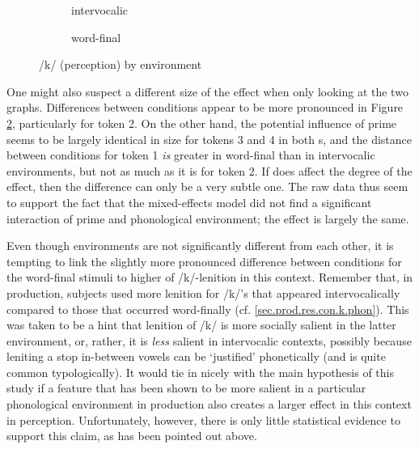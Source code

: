 \begin{figure}[h]
	\centering
	\begin{subfigure}{0.49\textwidth}
		\centering
			\resizebox{\linewidth}{!}{} 
		\caption{intervocalic}
		\label{fig.bar.k.ext.intervoc}
	\end{subfigure}
	\begin{subfigure}{0.49\textwidth}
		\centering
			\resizebox{\linewidth}{!}{}
		\caption{word-final}
		\label{fig.bar.k.ext.wordfinal}
	\end{subfigure}
	\caption{/k/ (perception) by environment}
	\label{fig.bar.k.ext.environment}
\end{figure}

One might also suspect a different size of the  effect when only looking at the two graphs.
Differences between conditions appear to be more pronounced in Figure \ref{fig.bar.k.ext.wordfinal}, particularly for token 2.
On the other hand, the potential influence of prime seems to be largely identical in size for tokens 3 and 4 in both s, and the distance between conditions for token 1 \emph{is} greater in word-final than in intervocalic environments, but not as much as it is for token 2.
If  does affect the degree of the  effect, then the difference can only be a very subtle one.
The raw data thus seem to support the fact that the mixed-effects model did not find a significant interaction of prime and phonological environment; the effect is largely the same.

Even though environments are not significantly different from each other, it is tempting to link the slightly more pronounced difference between  conditions for the word-final stimuli to higher  of /k/-lenition in this context.
Remember that, in production, subjects used more lenition for /k/'s that appeared intervocalically compared to those that occurred word-finally (cf. \ref{sec.prod.res.con.k.phon}).
This was taken to be a hint that lenition of /k/ is more socially salient in the latter environment, or, rather, it is \emph{less} salient in intervocalic contexts, possibly because leniting a stop in-between vowels can be `justified' phonetically (and is quite common typologically).
It would tie in nicely with the main hypothesis of this study if a feature that has been shown to be more salient in a particular phonological environment in production also creates a larger  effect in this context in perception.
Unfortunately, however, there is only little statistical evidence to support this claim, as has been pointed out above.

